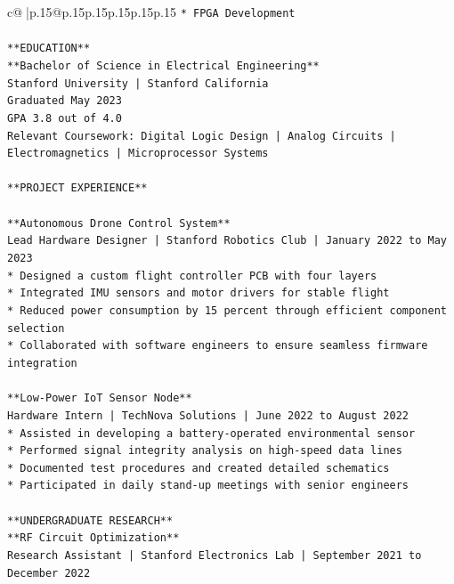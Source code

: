 \documentclass{article}
\begin{document}
{\begin{supertabular}{c@{$\;$}|p{.15\linewidth}@{}p{.15\linewidth}p{.15\linewidth}p{.15\linewidth}p{.15\linewidth}p{.15\linewidth}}
{{{\texttt{*   FPGA Development} \\
\\ 
\texttt{**EDUCATION**} \\
\texttt{**Bachelor of Science in Electrical Engineering**} \\
\texttt{Stanford University | Stanford California} \\
\texttt{Graduated May 2023} \\
\texttt{GPA 3.8 out of 4.0} \\
\texttt{Relevant Coursework: Digital Logic Design | Analog Circuits | Electromagnetics | Microprocessor Systems} \\
\\ 
\texttt{**PROJECT EXPERIENCE**} \\
\\ 
\texttt{**Autonomous Drone Control System**} \\
\texttt{Lead Hardware Designer | Stanford Robotics Club | January 2022 to May 2023} \\
\texttt{*   Designed a custom flight controller PCB with four layers} \\
\texttt{*   Integrated IMU sensors and motor drivers for stable flight} \\
\texttt{*   Reduced power consumption by 15 percent through efficient component selection} \\
\texttt{*   Collaborated with software engineers to ensure seamless firmware integration} \\
\\ 
\texttt{**Low{-}Power IoT Sensor Node**} \\
\texttt{Hardware Intern | TechNova Solutions | June 2022 to August 2022} \\
\texttt{*   Assisted in developing a battery{-}operated environmental sensor} \\
\texttt{*   Performed signal integrity analysis on high{-}speed data lines} \\
\texttt{*   Documented test procedures and created detailed schematics} \\
\texttt{*   Participated in daily stand{-}up meetings with senior engineers} \\
\\ 
\texttt{**UNDERGRADUATE RESEARCH**} \\
\texttt{**RF Circuit Optimization**} \\
\texttt{Research Assistant | Stanford Electronics Lab | September 2021 to December 2022} \\
}}}
\end{supertabular}}
\end{document}
